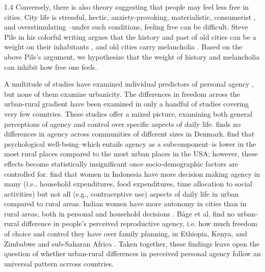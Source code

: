 \documentclass[10pt, letterpaper]{article}
\begin{document}
\begin{spacing}{1.4}
Conversely, there is also theory suggesting that people may feel less free in cities. City life is stressful, hectic, anxiety-provoking, materialistic, consumerist \citep{aokCityBook15}, and overstimulating \citep{simmel03,lederbogen11}--under such conditions, feeling free can be difficult.
Steve Pile in his colorful writing argues that the history and past of old
cities can be a weight on their inhabitants \citep{pile05,pile05B,pile99}, and
old cities carry melancholia \citep{pile05B}. Based on the above Pile's
argument, we hypothesize that the weight of history and melancholia can inhibit how free one feels.

A multitude of studies have examined individual predictors of personal agency%
 \citep[e.g.,][]{aok_free_from_to,pitlik2016free,nikolaev2016give}, but none of them examine urbanicity. %
 The differences in freedom across the urban-rural gradient have been examined
 in only a handful of studies covering very few countries. These studies offer a
 mixed picture, examining both general perceptions of agency and control over
 specific aspects of daily life. \citet{lolle2023differences} finds no
 differences in agency across communities of different sizes in Denmark. %
\citet{atherton2024rural} find that psychological well-being--which entails agency as a subcomponent--is lower in the most rural places compared to the most urban places in the USA; however, these effects become statistically insignificant once socio-demographic factors are controlled for. 
\citet{kusnali2025rural} find that women in Indonesia have more decision making agency in many (i.e., household expenditures, food expenditures, time allocation to social activities) but not all (e.g., contraceptive use) aspects of daily life in urban compared to rural areas. Indian women have more autonomy in cities than in rural areas, both in personal and household decisions \citep{mishra2014relative}. 
B\r{a}ge et al. find no urban-rural difference in people's
perceived reproductive agency, i.e. how much freedom of choice and control they have over family planning, in Ethiopia, Kenya, and Zimbabwe \citep{baage2024attitudes} and sub-Saharan Africa \citep{baage2026reproductive}.
Taken together, these findings leave open the question of whether urban-rural
differences in perceived personal agency follow an universal  pattern acrross countries. 




\end{spacing}
\end{document}
